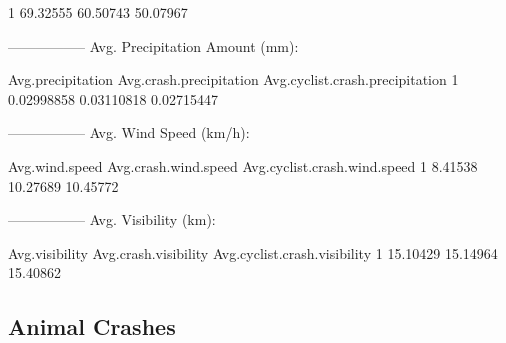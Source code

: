 \documentclass[11pt, a4paper]{article}
\begin{document}
\begin{Schunk}
\begin{Soutput}
1     69.32555           60.50743                   50.07967
\end{Soutput}
\begin{Soutput}
-----------------
Avg. Precipitation Amount (mm):
\end{Soutput}
\begin{Soutput}
  Avg.precipitation Avg.crash.precipitation Avg.cyclist.crash.precipitation
1        0.02998858              0.03110818                      0.02715447
\end{Soutput}
\begin{Soutput}
-----------------
Avg. Wind Speed (km/h):
\end{Soutput}
\begin{Soutput}
  Avg.wind.speed Avg.crash.wind.speed Avg.cyclist.crash.wind.speed
1        8.41538             10.27689                     10.45772
\end{Soutput}
\begin{Soutput}
-----------------
Avg. Visibility (km):
\end{Soutput}
\begin{Soutput}
  Avg.visibility Avg.crash.visibility Avg.cyclist.crash.visibility
1       15.10429             15.14964                     15.40862
\end{Soutput}
\end{Schunk}






\pagebreak
\subsection{Animal Crashes}
\end{document}
